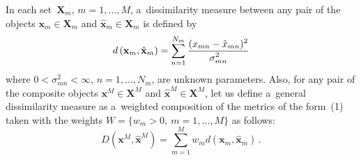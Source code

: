 \begin{multicols}{2}
In each set~$\mathbf{X}_m$, $m=1,\ldots , M$, a~dissimilarity measure between 
any pair of the objects $\mathbf{x}_m\in \mathbf{X}_m$ and 
$\hat{\mathbf{x}}_m\in \mathbf{X}_m$ is defined by
\begin{equation}
d\left( \mathbf{x}_m, \hat{\mathbf{x}}_m\right) =\sum\limits_{n=1}^{N_m} 
\displaystyle\frac{\displaystyle (x_{mn}-\hat{x}_{mn})^2\mathstrut}{\displaystyle \sigma^2_{mn}\mathstrut}
\label{e1-l}
\end{equation}
where $0<\sigma^2_{mn} <\infty$, $n=1,\ldots , N_m$, are unknown parameters. 
Also, for any pair of the composite objects $\mathbf{x}^M\in \mathbf{X}^M$ and 
$\hat{\mathbf{x}}^M\in \mathbf{X}^M$, let us define a~general dissimilarity 
measure as a~weighted composition of the metrics of the form~(1) taken with the 
weights $W=\{w_m>0,\ m=1,\ldots , M\}$ as follows:
\begin{equation}
D\left( \mathbf{x}^M, \hat{\mathbf{x}}^M\right) =\sum\limits^M_{m=1} w_m
d\left( 
\mathbf{x}_m, \hat{\mathbf{x}}_m\right)\,.
\label{e2-l}
\end{equation}


\end{multicols}
